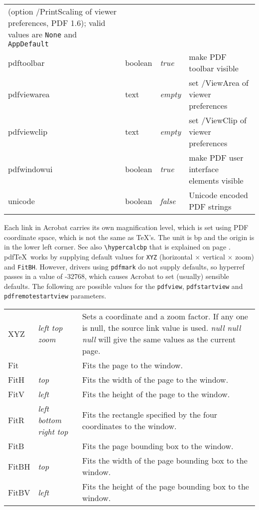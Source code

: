 \documentclass[pdftex]{article}
\begin{document}
\begin{longtable}{@{}>{\ttfamily}l>{\raggedright}p{}>{\itshape}lp{7cm}@{}}
                                       (option /PrintScaling of viewer
                                       preferences, PDF 1.6);
                                       valid values are \texttt{None} and
                                       \texttt{AppDefault} \\
pdftoolbar         & boolean & true  & make PDF toolbar visible \\
pdfviewarea        & text    & empty & set /ViewArea of viewer preferences \\
pdfviewclip        & text    & empty & set /ViewClip of viewer preferences \\
pdfwindowui        & boolean & true  & make PDF user interface elements visible \\
unicode            & boolean & false & Unicode encoded PDF strings
\end{longtable}

Each link in Acrobat carries its own magnification level, which is set
using PDF coordinate space, which is not the same as \TeX's. The unit
is bp and the origin is in the lower left corner. See also
\verb|\hypercalcbp| that is explained on page \pageref{hypercalcbp}.
pdf\TeX\
works by supplying default values for \texttt{XYZ} (horizontal $\times$
vertical $\times$ zoom) and \texttt{FitBH}. However, drivers using
\texttt{pdfmark} do not supply defaults, so \textsf{hyperref} passes in
a value of -32768, which causes Acrobat to set (usually) sensible
defaults. The following are possible values for the \texttt{pdfview},
\texttt{pdfstartview} and \texttt{pdfremotestartview} parameters.

\begin{longtable}{@{}>{\ttfamily}l>{\itshape}lp{7cm}@{}}
XYZ   & left top zoom         & Sets a coordinate and a zoom factor. If any one is null, the source link value is used.
                                \textit{null null null} will give the same values as the current page. \\
Fit   &                       & Fits the page to the window. \\
FitH  & top                   & Fits the width of the page to the window. \\
FitV  & left                  & Fits the height of the page to the window. \\
FitR  & left bottom right top & Fits the rectangle specified by the four coordinates to the window. \\
FitB  &                       & Fits the page bounding box to the window. \\
FitBH & top                   & Fits the width of the page bounding box to the window. \\
FitBV & left                  & Fits the height of the page bounding box to the window. \\
\end{longtable}
\end{document}
